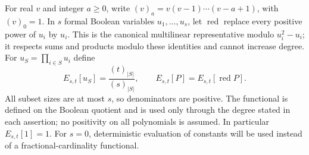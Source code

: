 For real $v$ and integer $a\ge0$, write
$(v)_a=v(v-1)\cdots(v-a+1)$, with $(v)_0=1$.
In $s$ formal Boolean variables $u_1,\ldots,u_s$, let $\operatorname{red}$
replace every positive power of $u_i$ by $u_i$. This is the canonical
multilinear representative modulo $u_i^2-u_i$; it respects sums and
products modulo these identities and cannot increase degree. For
$u_S=\prod_{i\in S}u_i$ define
\begin{equation}\label{eq:fractional-moments}
 E_{s,t}[u_S]=\frac{(t)_{|S|}}{(s)_{|S|}},\qquad
 E_{s,t}[P]=E_{s,t}[\operatorname{red}P].
\end{equation}
All subset sizes are at most $s$, so denominators are positive. The
functional is defined on the Boolean quotient and is used only through
the degree stated in each assertion; no positivity on all polynomials is
assumed. In particular $E_{s,t}[1]=1$. For $s=0$, deterministic evaluation
of constants will be used instead of a fractional-cardinality functional.

